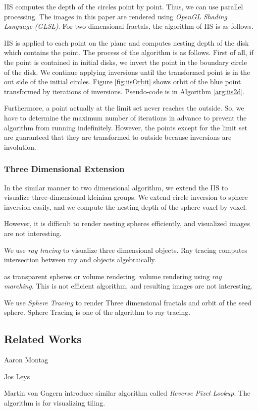 IIS computes the depth of the circles point by point.
Thus, we can use parallel processing.
The images in this paper are rendered using \textit{OpenGL Shading
Language (GLSL)}.
For two dimensional fractals, the algorithm of IIS is as follows.

IIS is applied to each point on the plane and computes nesting depth of
the disk which contains the point.
The process of the algorithm is as follows.
First of all, if the point is contained in initial disks, we invert the
point in the boundary circle of the disk.
We continue applying inversions until the transformed point is in the
out side of the initial circles.
Figure \ref{fig:iisOrbit} shows orbit of the blue point transformed by
iterations of inversions.
Pseudo-code is in Algorithm \ref{arg:iis2d}.

Furthermore, a point actually at the limit set never reaches the
outside. So, we have to determine the maximum number of iterations in
advance to prevent the algorithm from running indeﬁnitely.
However, the points except for the limit set are guaranteed that they
are transformed to outside because inversions are involution.

\subsubsection{Three Dimensional Extension}


In the similar manner to two dimensional algorithm,
we extend the IIS to visualize three-dimensional kleinian groups.
We extend circle inversion to sphere inversion easily, and we
compute the nesting depth of the sphere voxel by voxel.

However, it is difficult to render nesting spheres efficiently, and
visualized images are not interesting.

We use \textit{ray tracing} to visualize three dimensional objects.
Ray tracing computes intersection between ray and objects algebraically.

as transparent spheres or volume rendering.
volume rendering using \textit{ray marching}.
This is not efficient algorithm, and resulting images are not interesting.


We use \textit{Sphere Tracing} to render Three dimensional
fractals and orbit of the seed sphere.
Sphere Tracing is one of the algorithm to ray tracing.


\subsection{Related Works}

Aaron Montag

Jos Leys

Martin von Gagern introduce similar algorithm called \textit{Reverse
Pixel Lookup}. The algorithm is for visualizing tiling.